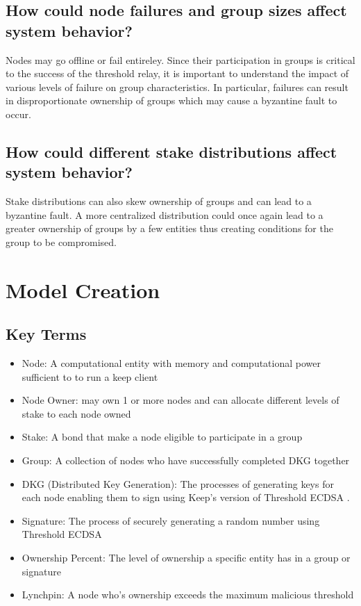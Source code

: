 \documentclass[conference]{IEEEtran}
\begin{document}
\subsection{How could node failures and group sizes affect system behavior?}
Nodes may go offline or fail entireley. Since their participation in groups is critical to the 
success of the threshold relay, it is important to understand the impact of various levels
of failure on group characteristics. In particular, failures can result in disproportionate ownership
of groups which may cause a byzantine fault to occur. 

\subsection{How could different stake distributions affect system behavior?}
Stake distributions can also skew ownership of groups and can lead to a byzantine fault. A more
centralized distribution could once again lead to a greater ownership of groups by a few entities
thus creating conditions for the group to be compromised. 

\section{Model Creation}

\subsection{Key Terms}
\begin{itemize}
\item Node: A computational entity with memory and computational power sufficient to to run a 
keep client
    
\item Node Owner: may own 1 or more nodes and can allocate different levels of stake to each node
    owned
    
\item Stake: A bond that make a node eligible to participate in a group 
    
\item Group: A collection of nodes who have successfully completed DKG together
    
\item DKG (Distributed Key Generation): The processes of generating keys for each node enabling
    them to sign using Keep's version of Threshold ECDSA \cite{Gennaro2018}.
    
\item Signature: The process of securely generating a random number using Threshold ECDSA \cite{Gennaro2018}
    
\item Ownership Percent: The level of ownership a specific entity has in a group or signature
    
\item Lynchpin: A node who's ownership exceeds the maximum malicious threshold
\end{itemize}
\end{document}
